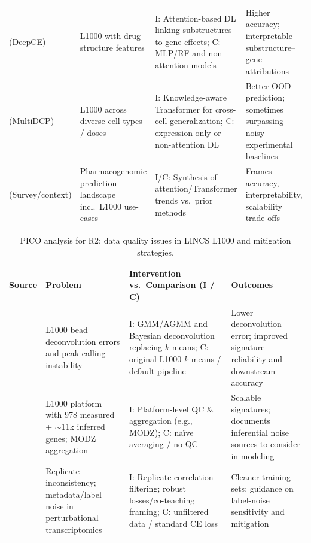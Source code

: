 \documentclass[twocolumn,12pt,a4paper]{article}
\begin{document}
{\begin{table}[t]
\begin{tabular}{p{3.1cm} p{4.8cm} p{5.1cm} p{3.3cm}}
    \cite{pham2021deep} (DeepCE) &
    L1000 with drug structure features &
    I\@: Attention-based DL linking substructures to gene effects; 
    C\@: MLP/RF and non-attention models &
    Higher accuracy; interpretable substructure–gene attributions \\
    [0.35em]

    \cite{wu2022deep} (MultiDCP) &
    L1000 across diverse cell types / doses &
    I\@: Knowledge-aware Transformer for cross-cell generalization; 
    C\@: expression-only or non-attention DL &
    Better OOD prediction; sometimes surpassing noisy experimental baselines \\
    [0.35em]

    \cite{chow2022predicting} (Survey/context) &
    Pharmacogenomic prediction landscape incl.\ L1000 use-cases &
    I/C\@: Synthesis of attention/Transformer trends vs.\ prior methods &
    Frames accuracy, interpretability, scalability trade-offs \\
    \bottomrule
  \end{tabular}
\end{table}

\begin{table}[t]
  \centering
  \caption{PICO analysis for R2: data quality issues in LINCS L1000 and mitigation strategies.}
  \begin{tabular}{p{3.1cm} p{4.8cm} p{5.8cm} p{3.3cm}}
    \toprule
    \textbf{Source} & \textbf{Problem} & \textbf{Intervention vs.\ Comparison (I / C)} & \textbf{Outcomes} \\
    \midrule
    \cite{qiu2020bayesian} &
    L1000 bead deconvolution errors and peak-calling instability &
    I\@: GMM/AGMM and Bayesian deconvolution replacing $k$-means; C\@: original L1000 $k$-means / default pipeline &
    Lower deconvolution error; improved signature reliability and downstream accuracy \\[0.35em]

    \cite{subramanian2017next} &
    L1000 platform with 978 measured + $\sim$11k inferred genes; MODZ aggregation &
    I\@: Platform-level QC \& aggregation (e.g., MODZ); 
    C\@: naïve averaging / no QC &
    Scalable signatures; documents inferential noise sources to consider in modeling \\[0.35em]

    \cite{szalai2019signatures} &
    Replicate inconsistency; metadata/label noise in perturbational transcriptomics &
    I\@: Replicate-correlation filtering; robust losses/co-teaching framing; 
    C\@: unfiltered data / standard CE loss &
    Cleaner training sets; guidance on label-noise sensitivity and mitigation \\[0.35em]


\end{tabular}
\end{table}}
\end{document}
